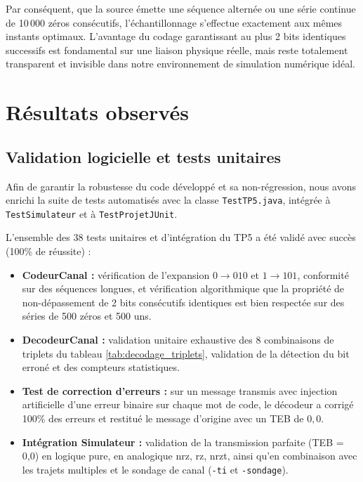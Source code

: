 \documentclass[a4paper,12pt]{report}
\begin{document}
Par conséquent, que la source émette une séquence alternée ou une série continue de 10\,000 zéros consécutifs, l'échantillonnage s'effectue exactement aux mêmes instants optimaux. L'avantage du codage garantissant au plus 2 bits identiques successifs est fondamental sur une liaison physique réelle, mais reste totalement transparent et invisible dans notre environnement de simulation numérique idéal.

\section{Résultats observés}

\subsection{Validation logicielle et tests unitaires}

Afin de garantir la robustesse du code développé et sa non-régression, nous avons enrichi la suite de tests automatisés avec la classe \texttt{TestTP5.java}, intégrée à \texttt{TestSimulateur} et à \texttt{TestProjetJUnit}. 

L'ensemble des 38 tests unitaires et d'intégration du TP5 a été validé avec succès (100\% de réussite) :
\begin{itemize}
    \item \textbf{CodeurCanal :} vérification de l'expansion $0 \to 010$ et $1 \to 101$, conformité sur des séquences longues, et vérification algorithmique que la propriété de non-dépassement de 2 bits consécutifs identiques est bien respectée sur des séries de 500 zéros et 500 uns.
    \item \textbf{DecodeurCanal :} validation unitaire exhaustive des 8 combinaisons de triplets du tableau \ref{tab:decodage_triplets}, validation de la détection du bit erroné et des compteurs statistiques.
    \item \textbf{Test de correction d'erreurs :} sur un message transmis avec injection artificielle d'une erreur binaire sur chaque mot de code, le décodeur a corrigé 100\% des erreurs et restitué le message d'origine avec un TEB de $0{,}0$.
    \item \textbf{Intégration Simulateur :} validation de la transmission parfaite (TEB = 0,0) en logique pure, en analogique \gls{nrz}, \gls{rz}, \gls{nrzt}, ainsi qu'en combinaison avec les trajets multiples et le sondage de canal (\texttt{-ti} et \texttt{-sondage}).
\end{itemize}
\end{document}
